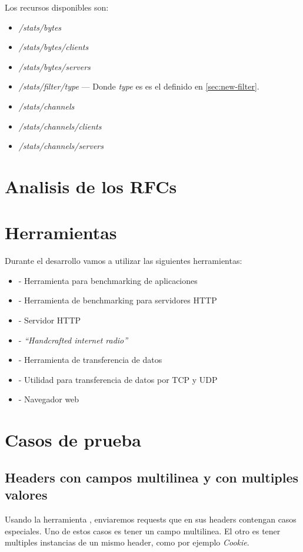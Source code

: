 \documentclass[11pt,a4paper,titlepage]{article}
\begin{document}
Los recursos disponibles son:
\begin{itemize}
    \item \textit{/stats/bytes}
    \item \textit{/stats/bytes/clients}
    \item \textit{/stats/bytes/servers}
    \item \textit{/stats/filter/type} --- Donde \textit{type} es es el definido en \ref{sec:new-filter}.
    \item \textit{/stats/channels}
    \item \textit{/stats/channels/clients}
    \item \textit{/stats/channels/servers}
\end{itemize}

\section{Analisis de los RFCs}

\section{Herramientas}
    Durante el desarrollo vamos a utilizar las siguientes herramientas:
    \begin{itemize}
        \item {} - Herramienta para benchmarking de aplicaciones
        \item {} - Herramienta de benchmarking para servidores HTTP
        \item {} - Servidor HTTP
        \item {} - \emph{``Handcrafted internet radio''}
        \item {} - Herramienta de transferencia de datos
        \item {} - Utilidad para transferencia de datos por TCP y UDP
        \item {} - Navegador web
    \end{itemize}

\section{Casos de prueba}
\subsection{Headers con campos multilinea y con multiples valores}
Usando la herramienta , enviaremos requests que en sus headers contengan casos especiales.
Uno de estos casos es tener un campo multilinea.
El otro es tener multiples instancias de un mismo header, como por ejemplo \textit{Cookie}.
\end{document}

